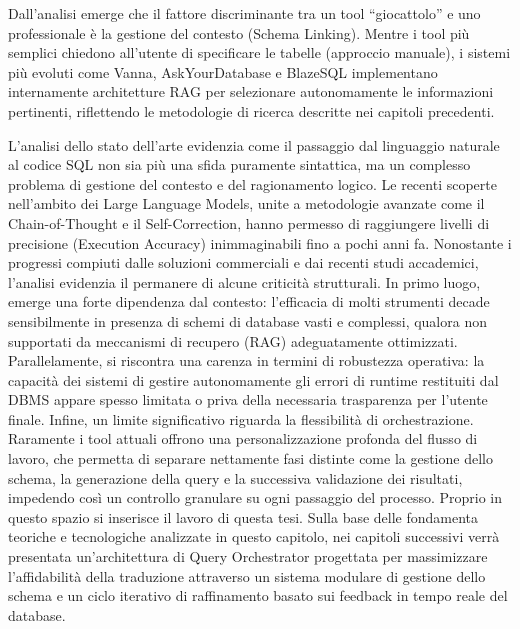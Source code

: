 Dall'analisi emerge che il fattore discriminante tra un tool
``giocattolo'' e uno professionale è la gestione del contesto (Schema
Linking). Mentre i tool più semplici chiedono all'utente di specificare
le tabelle (approccio manuale), i sistemi più evoluti come Vanna,
AskYourDatabase e BlazeSQL implementano internamente architetture RAG
per selezionare autonomamente le informazioni pertinenti, riflettendo le
metodologie di ricerca descritte nei capitoli precedenti.

L'analisi dello stato dell'arte evidenzia come il passaggio dal
linguaggio naturale al codice SQL non sia più una sfida puramente
sintattica, ma un complesso problema di gestione del contesto e del
ragionamento logico. Le recenti scoperte nell'ambito dei Large Language
Models, unite a metodologie avanzate come il Chain-of-Thought e il
Self-Correction, hanno permesso di raggiungere livelli di precisione
(Execution Accuracy) inimmaginabili fino a pochi anni fa. Nonostante i
progressi compiuti dalle soluzioni commerciali e dai recenti studi
accademici, l'analisi evidenzia il permanere di alcune criticità
strutturali. In primo luogo, emerge una forte dipendenza dal contesto:
l'efficacia di molti strumenti decade sensibilmente in presenza di
schemi di database vasti e complessi, qualora non supportati da
meccanismi di recupero (RAG) adeguatamente ottimizzati. Parallelamente,
si riscontra una carenza in termini di robustezza operativa: la capacità
dei sistemi di gestire autonomamente gli errori di runtime restituiti
dal DBMS appare spesso limitata o priva della necessaria trasparenza per
l'utente finale. Infine, un limite significativo riguarda la
flessibilità di orchestrazione. Raramente i tool attuali offrono una
personalizzazione profonda del flusso di lavoro, che permetta di
separare nettamente fasi distinte come la gestione dello schema, la
generazione della query e la successiva validazione dei risultati,
impedendo così un controllo granulare su ogni passaggio del processo.
Proprio in questo spazio si inserisce il lavoro di questa tesi. Sulla
base delle fondamenta teoriche e tecnologiche analizzate in questo
capitolo, nei capitoli successivi verrà presentata un'architettura di
Query Orchestrator progettata per massimizzare l'affidabilità della
traduzione attraverso un sistema modulare di gestione dello schema e un
ciclo iterativo di raffinamento basato sui feedback in tempo reale del
database.